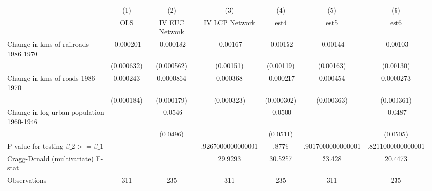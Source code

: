 {
\def\sym#1{\ifmmode^{#1}\else\(^{#1}\)\fi}
\begin{tabular}{l*{6}{c}}
\hline\hline
                &\multicolumn{1}{c}{(1)}&\multicolumn{1}{c}{(2)}&\multicolumn{1}{c}{(3)}&\multicolumn{1}{c}{(4)}&\multicolumn{1}{c}{(5)}&\multicolumn{1}{c}{(6)}\\
                &\multicolumn{1}{c}{OLS}&\multicolumn{1}{c}{IV EUC Network}&\multicolumn{1}{c}{IV LCP Network}&\multicolumn{1}{c}{est4}&\multicolumn{1}{c}{est5}&\multicolumn{1}{c}{est6}\\
\hline
Change in kms of railroads 1986-1970&-0.000201         &-0.000182         & -0.00167         & -0.00152         & -0.00144         & -0.00103         \\
                &(0.000632)         &(0.000562)         &(0.00151)         &(0.00119)         &(0.00163)         &(0.00130)         \\
[1em]
Change in kms of roads 1986-1970& 0.000243         &0.0000864         & 0.000368         &-0.000217         & 0.000454         &0.0000273         \\
                &(0.000184)         &(0.000179)         &(0.000323)         &(0.000302)         &(0.000363)         &(0.000361)         \\
[1em]
Change in log urban population 1960-1946&                  &  -0.0546         &                  &  -0.0500         &                  &  -0.0487         \\
                &                  & (0.0496)         &                  & (0.0511)         &                  & (0.0505)         \\
\hline
P-value for testing $\beta\_{2} >= \beta\_{1}$&                  &                  &.9267000000000001         &    .8779         &.9017000000000001         &.8211000000000001         \\
Cragg-Donald (multivariate) F-stat&                  &                  &  29.9293         &  30.5257         &   23.428         &  20.4473         \\
Observations    &      311         &      235         &      311         &      235         &      311         &      235         \\
\hline\hline
\end{tabular}
}
